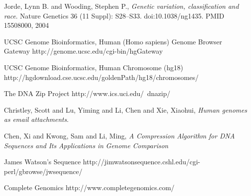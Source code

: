 \documentclass{article}
\begin{document}
\begin{thebibliography}{}

  Jorde, Lynn B. and Wooding, Stephen P.,
  \emph{Genetic variation, classification and race}.
  Nature Genetics 36 (11 Suppl): S28–S33. doi:10.1038/ng1435. PMID 15508000,
  2004

  UCSC Genome Bioinformatics, Human (Homo sapiens) Genome Browser Gateway
  http://genome.ucsc.edu/cgi-bin/hgGateway

  UCSC Genome Bioinformatics, Human Chromosome (hg18)
  http://hgdownload.cse.ucsc.edu/goldenPath/hg18/chromosomes/

  The DNA Zip Project
  http://www.ics.uci.edu/~dnazip/

  Christley, Scott and Lu, Yiming and Li, Chen and Xie, Xiaohui,
  \emph{Human genomes as email attachments}.

  Chen, Xi and Kwong, Sam and Li, Ming,
  \emph{A Compression Algorithm for DNA Sequences and Its Applications in Genome Comparison}
 
  James Watson's Sequence
  http://jimwatsonsequence.cshl.edu/cgi-perl/gbrowse/jwsequence/

  Complete Genomics
  http://www.completegenomics.com/ 
\end{thebibliography}
\end{document}
